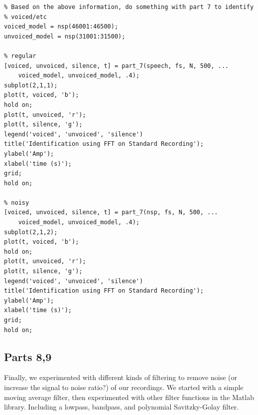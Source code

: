 \documentclass[11pt]{article}
\begin{document}
\begin{lstlisting}
% Based on the above information, do something with part 7 to identify
% voiced/etc
voiced_model = nsp(46001:46500);
unvoiced_model = nsp(31001:31500);

% regular
[voiced, unvoiced, silence, t] = part_7(speech, fs, N, 500, ...
    voiced_model, unvoiced_model, .4);
subplot(2,1,1);
plot(t, voiced, 'b');
hold on;
plot(t, unvoiced, 'r');
plot(t, silence, 'g');
legend('voiced', 'unvoiced', 'silence')
title('Identification using FFT on Standard Recording');
ylabel('Amp');
xlabel('time (s)');
grid;
hold on;

% noisy
[voiced, unvoiced, silence, t] = part_7(nsp, fs, N, 500, ...
    voiced_model, unvoiced_model, .4);
subplot(2,1,2);
plot(t, voiced, 'b');
hold on;
plot(t, unvoiced, 'r');
plot(t, silence, 'g');
legend('voiced', 'unvoiced', 'silence')
title('Identification using FFT on Standard Recording');
ylabel('Amp');
xlabel('time (s)');
grid;
hold on;
\end{lstlisting}


\subsection{Parts 8,9}
Finally, we experimented with different kinds of filtering to remove noise (or increase the signal to noise ratio?) of our recordings. We started with a simple moving average filter, then experimented with other filter functions in the Matlab library. Including a lowpass, bandpass, and polynomial Savitzky-Golay filter.
\end{document}
